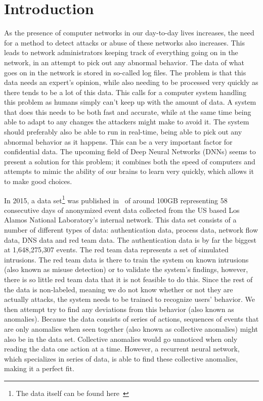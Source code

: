 \chapter{Introduction}\label{ch:introduction}
As the presence of computer networks in our day-to-day lives increases, the need for a method to detect attacks or abuse of these networks also increases. This leads to network administrators keeping track of everything going on in the network, in an attempt to pick out any abnormal behavior. The data of what goes on in the network is stored in so-called log files. The problem is that this data needs an expert's opinion, while also needing to be processed very quickly as there tends to be a lot of this data. This calls for a computer system handling this problem as humans simply can't keep up with the amount of data. A system that does this needs to be both fast and accurate, while at the same time being able to adapt to any changes the attackers might make to avoid it. The system should preferably also be able to run in real-time, being able to pick out any abnormal behavior as it happens. This can be a very important factor for confidential data. The upcoming field of Deep Neural Networks (DNNs) seems to present a solution for this problem; it combines both the speed of computers and attempts to mimic the ability of our brains to learn very quickly, which allows it to make good choices.

In 2015, a data set\footnote{The data itself can be found here~\cite{kent-2015-cyberdata1}} was published in~\cite{akent-2015-enterprise-data} of around 100GB representing 58 consecutive days of anonymized event data collected from the US based Los Alamos National Laboratory's internal network. This data set consists of a number of different types of data: authentication data, process data, network flow data, DNS data and red team data. The authentication data is by far the biggest at 1,648,275,307 events. The red team data represents a set of simulated intrusions. The red team data is there to train the system on known intrusions (also known as misuse detection) or to validate the system's findings, however, there is so little red team data that it is not feasible to do this. Since the rest of the data is non-labeled, meaning we do not know whether or not they are actually attacks, the system needs to be trained to recognize users' behavior. We then attempt try to find any deviations from this behavior (also known as anomalies). Because the data consists of series of actions, sequences of events that are only anomalies when seen together (also known as collective anomalies) might also be in the data set. Collective anomalies would go unnoticed when only reading the data one action at a time. However, a recurrent neural network, which specializes in series of data, is able to find these collective anomalies, making it a perfect fit.

